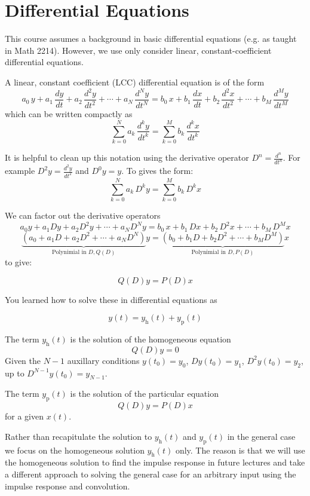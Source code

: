 \section{Differential Equations}

This course assumes a background in basic differential equations (e.g. as taught in Math 2214). However, we use only consider linear, constant-coefficient differential equations.

A linear, constant coefficient (LCC) differential equation is of the form
\[
a_0\, y + a_1\, \frac{dy}{dt} + a_2\, \frac{d^2y}{dt^2} + \cdots + a_N\, \frac{d^Ny}{dt^N}  = b_0\, x + b_1\, \frac{dx}{dt} + b_2\, \frac{d^2x}{dt^2} + \cdots + b_M\, \frac{d^My}{dt^M}
\]
which can be written compactly as
\[
\sum\limits_{k = 0}^{N} a_k\, \frac{d^ky}{dt^k} = \sum\limits_{k = 0}^{M} b_k\, \frac{d^kx}{dt^k}
\]

It is helpful to clean up this notation using the derivative operator $D^n = \frac{d^n}{dt^n}$. For example
$D^2y = \frac{d^2y}{dt^2}$ and $D^0 y= y$. To gives the form:
\[
\sum\limits_{k = 0}^{N} a_k\, D^k y = \sum\limits_{k = 0}^{M} b_k\, D^k x
\]

We can factor out the derivative operators
\[
a_0y + a_1Dy + a_2D^2y + \cdots + a_ND^Ny  = b_0\, x + b_1\, Dx + b_2\, D^2x + \cdots + b_M\, D^M x
\]
\[
\underbrace{\left(a_0 + a_1D + a_2D^2 + \cdots + a_ND^N\right)}_{\text{Polynimial in } D, Q(D)} y = \underbrace{\left(b_0 + b_1 D + b_2 D^2 + \cdots + b_M D^M\right)}_{\text{Polynimial in } D, P(D)} x
\]
to give:
  
\[
Q(D)y = P(D)x
\]

You learned how to solve these in differential equations as

\[
y(t) = y_\text{h}(t) + y_\text{p}(t)
\]

The term $y_\text{h}(t)$ is the solution of the homogeneous equation
\[
Q(D)y = 0
\]
Given the $N-1$ auxillary conditions $y(t_0) = y_0$, $Dy(t_0) = y_1$, $D^2y(t_0) = y_2$, up to $D^{N-1}y(t_0) = y_{N-1}$.

The term $y_\text{p}(t)$ is the solution of the particular equation
\[
Q(D)y = P(D)x
\]
for a given $x(t)$.

Rather than recapitulate the solution to $y_\text{h}(t)$ and $y_\text{p}(t)$ in the general case we focus on the homogeneous solution $y_\text{h}(t)$ only. The reason is that we will use the homogeneous solution to find the impulse response in future lectures and take a different approach to solving the general case for an arbitrary input using the impulse response and convolution.

